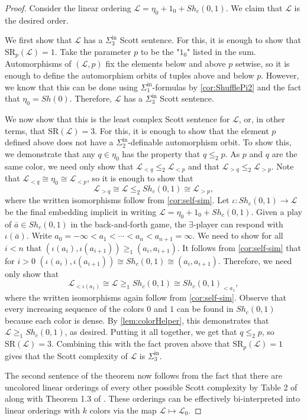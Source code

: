 \documentclass[11pt]{amsart}
\newcommand{\SR}{\text{SR}}
\newcommand{\mc}[1]{\mathcal{#1}}
\newcommand{\Sinf}[1]{\Sigma^{\mathrm{in}}_{#1}}
\theoremstyle{remark}
\begin{document}
\begin{proof}
    Consider the linear ordering $\mc{L}=\eta_0+1_0+Sh_c(0,1)$.
    We claim that $\mc{L}$ is the desired order.
    
    We first show that $\mc{L}$ has a $\Sinf{3}$ Scott sentence.
    For this, it is enough to show that $\SR_p(\mc{L})=1$.
    Take the parameter $p$ to be the "$1_0$" listed in the sum.
    Automorphisms of $(\mc{L},p)$ fix the elements below and above $p$ setwise, so it is enough to define the automorphism orbits of tuples above and below $p$.
		However, we know that this can be done using $\Sinf{1}$-formulas by \cref{cor:ShufflePi2} and the fact that $\eta_0=Sh(0)$.
    Therefore, $\mc{L}$ has a $\Sinf{3}$ Scott sentence.

    We now show that this is the least complex Scott sentence for $\mc L$, or, in other terms, that $\SR(\mc{L})=3$.
		For this, it is enough to show that the element $p$ defined above does not have a $\Sinf{2}$-definable automorphism orbit. 
    To show this, we demonstrate that any $q\in \eta_0$ has the property that $q\leq_2 p$.
    As $p$ and $q$ are the same color, we need only show that $\mc{L}_{<q}\leq_2\mc{L}_{<p}$ and that $\mc{L}_{>q}\leq_2\mc{L}_{>p}$.
    Note that $\mc{L}_{<q}\cong\eta_0\cong\mc{L}_{<p}$, so it is enough to show that
    \[\mc{L}_{>q}\cong \mc{L} \leq_2 Sh_c(0,1) \cong \mc{L}_{>p},\]
    where the written isomorphisms follow from \cref{cor:self-sim}.
    Let $\iota:Sh_c(0,1)\to \mc{L}$ be the final embedding implicit in writing $\mc{L}=\eta_0+1_0+Sh_c(0,1)$.
    Given a play of $\bar{a}\in Sh_c(0,1)$ in the back-and-forth game, the $\exists$-player can respond with $\iota(\bar{a})$.
    Write $a_0=-\infty<a_1<\cdots<a_n<a_{n+1}=\infty$.
    We need to show for all $i<n$ that $(\iota(a_i),\iota(a_{i+1}))\geq_1 (a_i,a_{i+1}).$
    It follows from \cref{cor:self-sim} that for $i>0$ $(\iota(a_i),\iota(a_{i+1}))\cong Sh_c(0,1)\cong (a_i,a_{i+1}).$
    Therefore, we need only show that 
    \[\mc{L}_{<\iota(a_1)}\cong \mc{L} \geq_1 Sh_c(0,1) \cong Sh_c(0,1)_{<a_1},\]
    where the written isomorphisms again follow from \cref{cor:self-sim}.
    Observe that every increasing sequence of the colors $0$ and $1$ can be found in $Sh_c(0,1)$ because each color is dense.
    By \cref{lem:colorHelper}, this demonstrates that  $\mc{L} \geq_1 Sh_c(0,1)$, as desired.
    Putting it all together, we get that $q\leq_2 p$, so $\SR(\mc{L})=3$. Combining this with the fact proven above that $\SR_p(\mc{L})=1$ gives that the Scott complexity of $\mc{L}$ is $\Sinf{3}$.

    The second sentence of the theorem now follows from the fact that there are uncolored linear orderings of every other possible Scott complexity by Table 2 of \cite{GR23} along with Theorem 1.3 of \cite{GHTH}.
    These orderings can be effectively bi-interpreted into linear orderings with $k$ colors via the map $\mc{L}\mapsto \mc{L}_0$.
\end{proof}
\end{document}
